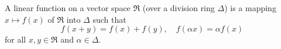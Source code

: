 A linear function on a vector space $\mathfrak{R}$ (over a division ring $\Delta$) is a mapping $x \mapsto f(x)$ of $\mathfrak{R}$ into $\Delta$ such that
$$
f(x + y) = f(x) + f(y), \quad f(\alpha x) = \alpha f(x)
$$
for all $x, y \in \mathfrak{R}$ and $\alpha \in \Delta$.
